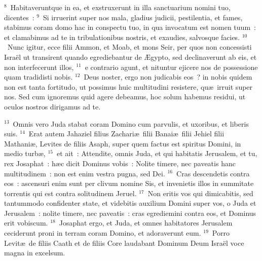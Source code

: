 ${}^{8}$~Habitaveruntque in ea, et exstruxerunt in illa sanctuarium nomini tuo, dicentes~:
${}^{9}$~Si irruerint super nos mala, gladius judicii, pestilentia, et fames, stabimus coram domo hac in conspectu tuo, in qua invocatum est nomen tuum~: et clamabimus ad te in tribulationibus nostris, et exaudies, salvosque facies.
${}^{10}$~Nunc igitur, ecce filii Ammon, et Moab, et mons Seir, per quos non concessisti Isra\"el ut transirent quando egrediebantur de \AE gypto, sed declinaverunt ab eis, et non interfecerunt illos,
${}^{11}$~e contrario agunt, et nituntur ejicere nos de possessione quam tradidisti nobis.
${}^{12}$~Deus noster, ergo non judicabis eos~? in nobis quidem non est tanta fortitudo, ut possimus huic multitudini resistere, qu\ae\ irruit super nos. Sed cum ignoremus quid agere debeamus, hoc solum habemus residui, ut oculos nostros dirigamus ad te.


${}^{13}$~Omnis vero Juda stabat coram Domino cum parvulis, et uxoribus, et liberis suis.
${}^{14}$~Erat autem Jahaziel filius Zachari\ae\ filii Banai\ae\ filii Jehiel filii Mathani\ae , Levites de filiis Asaph, super quem factus est spiritus Domini, in medio turb\ae ,
${}^{15}$~et ait~: Attendite, omnis Juda, et qui habitatis Jerusalem, et tu, rex Josaphat~: h\ae c dicit Dominus vobis~: Nolite timere, nec paveatis hanc multitudinem~: non est enim vestra pugna, sed Dei.
${}^{16}$~Cras descendetis contra eos~: ascensuri enim sunt per clivum nomine Sis, et invenietis illos in summitate torrentis qui est contra solitudinem Jeruel.
${}^{17}$~Non eritis vos qui dimicabitis, sed tantummodo confidenter state, et videbitis auxilium Domini super vos, o Juda et Jerusalem~: nolite timere, nec paveatis~: cras egrediemini contra eos, et Dominus erit vobiscum.
${}^{18}$~Josaphat ergo, et Juda, et omnes habitatores Jerusalem ceciderunt proni in terram coram Domino, et adoraverunt eum.
${}^{19}$~Porro Levit\ae\ de filiis Caath et de filiis Core laudabant Dominum Deum Isra\"el voce magna in excelsum.


